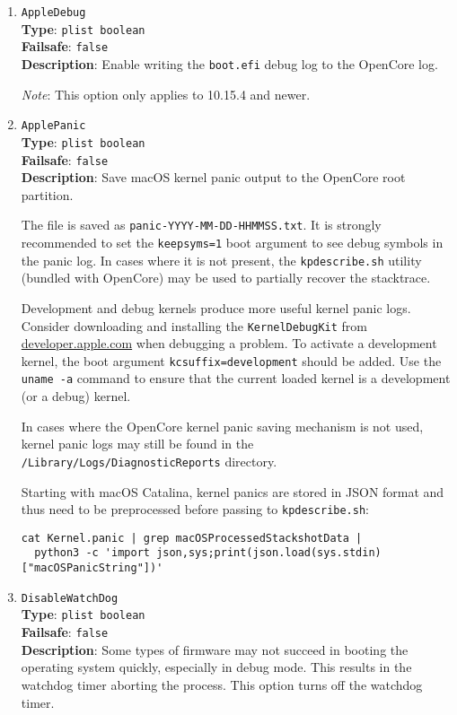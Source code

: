 \documentclass[]{article}
\begin{document}
\begin{enumerate}

\item
  \texttt{AppleDebug}\\
  \textbf{Type}: \texttt{plist\ boolean}\\
  \textbf{Failsafe}: \texttt{false}\\
  \textbf{Description}: Enable writing the \texttt{boot.efi} debug log to the OpenCore log.

  \emph{Note}: This option only applies to 10.15.4 and newer.

\item
  \texttt{ApplePanic}\\
  \textbf{Type}: \texttt{plist\ boolean}\\
  \textbf{Failsafe}: \texttt{false}\\
  \textbf{Description}: Save macOS kernel panic output to the OpenCore root partition.

  The file is saved as \texttt{panic-YYYY-MM-DD-HHMMSS.txt}. It is strongly
  recommended to set the \texttt{keepsyms=1} boot argument to see debug symbols
  in the panic log. In cases where it is not present, the \texttt{kpdescribe.sh}
  utility (bundled with OpenCore) may be used to partially recover the stacktrace.

  Development and debug kernels produce more useful kernel panic logs.
  Consider downloading and installing the \texttt{KernelDebugKit} from
  \href{https://developer.apple.com}{developer.apple.com} when debugging a problem.
  To activate a development kernel, the boot argument \texttt{kcsuffix=development} should be added.
  Use the \texttt{uname -a} command to ensure that the current loaded
  kernel is a development (or a debug) kernel.

  In cases where the OpenCore kernel panic saving mechanism is not used, kernel panic
  logs may still be found in the \texttt{/Library/Logs/DiagnosticReports} directory.

  Starting with macOS Catalina, kernel panics are stored in JSON format and thus
  need to be preprocessed before passing to \texttt{kpdescribe.sh}:

\begin{lstlisting}[label=kpanic, style=ocbash]
cat Kernel.panic | grep macOSProcessedStackshotData |
  python3 -c 'import json,sys;print(json.load(sys.stdin)["macOSPanicString"])'
\end{lstlisting}

\item
  \texttt{DisableWatchDog}\\
  \textbf{Type}: \texttt{plist\ boolean}\\
  \textbf{Failsafe}: \texttt{false}\\
  \textbf{Description}: Some types of firmware may not succeed in booting
  the operating system quickly, especially in debug mode. This results in the
  watchdog timer aborting the process. This option turns off the watchdog timer.


\end{enumerate}
\end{document}
